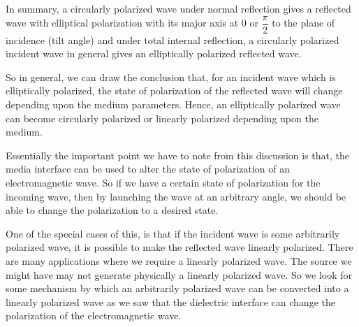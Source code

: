 In summary, a circularly polarized wave under normal reflection gives a reflected wave with elliptical polarization with its major axis at 0 or $\dfrac{\pi}{2}$ to the plane of incidence (tilt angle) and under total internal reflection, a circularly polarized incident wave in general gives an elliptically polarized reflected wave.

So in general, we can draw the conclusion that, for an incident wave which is elliptically polarized, the state of polarization of the reflected wave will change depending upon the medium parameters. Hence, an elliptically polarized wave can become circularly polarized or linearly polarized depending upon the medium.

Essentially the important point we have to note from this discussion is that, the media interface can be used to alter the state of polarization of an electromagnetic wave. So if we have a certain state of polarization for the incoming wave, then by launching the wave at an arbitrary angle, we should be able to change the polarization to a desired state.

One of the special cases of this, is that if the incident wave is some arbitrarily polarized wave, it is possible to make the reflected wave linearly polarized. There are many applications where we require a linearly polarized wave. The source we might have may not generate physically a linearly polarized wave.  So we look for some mechanism by which an arbitrarily polarized wave can be converted into a linearly polarized wave as we saw that the dielectric interface can change the polarization of the electromagnetic wave.

